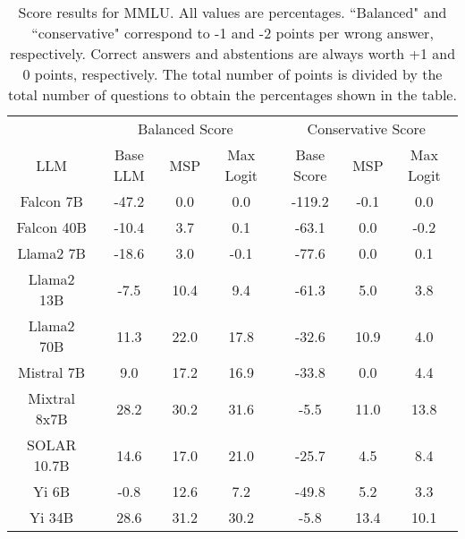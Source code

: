 \renewcommand\arraystretch{1.2}
\begin{table*}
\centering
\begin{tabular}{c|c|c|c|c|c|c}
& \multicolumn{3}{c|}{Balanced Score} & \multicolumn{3}{c}{Conservative Score} \\ 
LLM & Base LLM & MSP & Max Logit & Base Score & MSP & Max Logit\\ \hline
Falcon 7B & -47.2 & 0.0 & 0.0 & -119.2 & -0.1 & 0.0\\
Falcon 40B & -10.4 & 3.7 & 0.1 & -63.1 & 0.0 & -0.2\\
Llama2 7B & -18.6 & 3.0 & -0.1 & -77.6 & 0.0 & 0.1\\
Llama2 13B & -7.5 & 10.4 & 9.4 & -61.3 & 5.0 & 3.8\\
Llama2 70B & 11.3 & 22.0 & 17.8 & -32.6 & 10.9 & 4.0\\
Mistral 7B & 9.0 & 17.2 & 16.9 & -33.8 & 0.0 & 4.4\\
Mixtral 8x7B & 28.2 & 30.2 & 31.6 & -5.5 & 11.0 & 13.8\\
SOLAR 10.7B & 14.6 & 17.0 & 21.0 & -25.7 & 4.5 & 8.4\\
Yi 6B & -0.8 & 12.6 & 7.2 & -49.8 & 5.2 & 3.3\\
Yi 34B & 28.6 & 31.2 & 30.2 & -5.8 & 13.4 & 10.1\\
\hline
\end{tabular}
\caption{Score results for MMLU. All values are percentages. ``Balanced" and ``conservative" correspond to -1 and -2 points per wrong answer, respectively. Correct answers and abstentions are always worth +1 and 0 points, respectively. The total number of points is divided by the total number of questions to obtain the percentages shown in the table.}
\label{tab:mmlu_score}
\end{table*}
